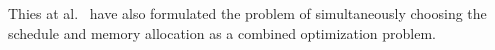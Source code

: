 Thies at al.~\cite{thies-pldi02} have also formulated the problem of
simultaneously choosing the schedule and memory allocation as a combined
optimization problem.
  
  
    	


